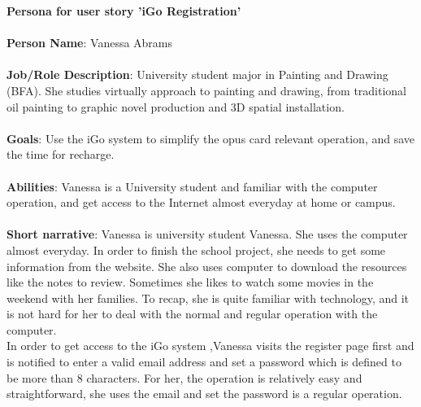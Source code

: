 \documentclass[11pt, english]{report}
\begin{document}
\textbf{Persona for user story 'iGo Registration'}
\\\\
\textbf{Person Name}: Vanessa Abrams 
\\\\
\textbf{Job/Role Description}: University student major in Painting and Drawing (BFA). She studies virtually approach to painting and drawing, from traditional oil painting to graphic novel production and 3D spatial installation.
\\\\
\textbf{Goals}: Use the iGo system to simplify the opus card relevant operation, and save the time for recharge.
\\\\
\textbf{Abilities}: Vanessa is a University student and familiar with the computer operation, and get access to the Internet almost everyday at home or campus.
\\\\
\textbf{Short narrative}: Vanessa is university student Vanessa. She uses the computer almost everyday. In order to finish the school project, she needs to get some information from the website. She also uses computer to download the resources like the notes to review. Sometimes she likes to watch some movies in the weekend with her families. To recap, she is quite familiar with technology, and it is not hard for her to deal with the normal and regular operation with the computer.\\

In order to get access to the iGo system ,Vanessa visits the register page first and is notified to enter a valid email address and set a password which is defined to be more than 8 characters. For her, the operation is relatively easy and straightforward, she uses the email and set the password is a regular operation.
\clearpage
\end{document}
